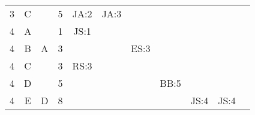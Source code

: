\documentclass[12pt]{article}
\begin{document}
\begin{table}[H]
\begin{tabular}{@{}c|c|c|c|ccccccc@{}}
3     & C    &            & 5                                                      & JA:2                                            & JA:3                                            &                                                  &                                                  &                                                  &                                                  &                                                  \\
4     & A    &            & 1                                                      & JS:1                                            &                                                 &                                                  &                                                  &                                                  &                                                  &                                                  \\
4     & B    & A          & 3                                                      &                                                 &                                                 & ES:3                                             &                                                  &                                                  &                                                  &                                                  \\
4     & C    &            & 3                                                      & RS:3                                            &                                                 &                                                  &                                                  &                                                  &                                                  &                                                  \\ 
4     & D    &            & 5                                                      &                                                 &                                                 &                                                  & BB:5                                             &                                                  &                                                  &                                                  \\ 
4     & E    & D          & 8                                                      &                                                 &                                                 &                                                  &                                                  & JS:4                                             & JS:4                                             &                                                  \\ 

\end{tabular}
\end{table}
\end{document}
